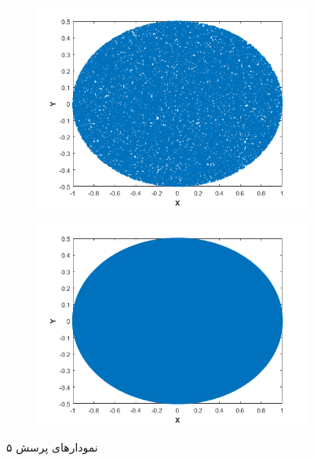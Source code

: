 \documentclass[10pt]{article}
\theoremstyle{definition}
\theoremstyle{lemma}
\theoremstyle{theorem}
\theoremstyle{remark}
\begin{document}
	\begin{figure}[h!]\ContinuedFloat
		\centering
		\begin{subfigure}[h!]{0.8\textwidth}
			\includegraphics[width=\textwidth]{./Images/5/50000.png}
			\caption{  }
		\end{subfigure}
		\quad
		\begin{subfigure}[h!]{0.8\textwidth}
			\includegraphics[width=\textwidth]{./Images/5/1000000.png}
			\caption{  }
		\end{subfigure}
		\caption{نمودار‌های پرسش ۵}
		\label{q5}
	\end{figure}
\end{document}
